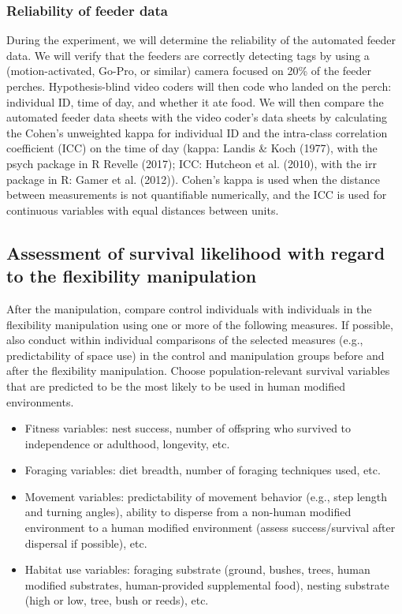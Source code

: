 \documentclass[
]{article}
\providecommand{\tightlist}{%
  \setlength{\itemsep}{0pt}\setlength{\parskip}{0pt}}
\begin{document}
\hypertarget{reliability-of-feeder-data}{%
\subsubsection{Reliability of feeder
data}\label{reliability-of-feeder-data}}

During the experiment, we will determine the reliability of the
automated feeder data. We will verify that the feeders are correctly
detecting tags by using a (motion-activated, Go-Pro, or similar) camera
focused on 20\% of the feeder perches. Hypothesis-blind video coders
will then code who landed on the perch: individual ID, time of day, and
whether it ate food. We will then compare the automated feeder data
sheets with the video coder's data sheets by calculating the Cohen's
unweighted kappa for individual ID and the intra-class correlation
coefficient (ICC) on the time of day (kappa: Landis \& Koch (1977), with
the psych package in R Revelle (2017); ICC: Hutcheon et al. (2010), with
the irr package in R: Gamer et al. (2012)). Cohen's kappa is used when
the distance between measurements is not quantifiable numerically, and
the ICC is used for continuous variables with equal distances between
units.

\hypertarget{assessment-of-survival-likelihood-with-regard-to-the-flexibility-manipulation}{%
\subsection{Assessment of survival likelihood with regard to the
flexibility
manipulation}\label{assessment-of-survival-likelihood-with-regard-to-the-flexibility-manipulation}}

After the manipulation, compare control individuals with individuals in
the flexibility manipulation using one or more of the following
measures. If possible, also conduct within individual comparisons of the
selected measures (e.g., predictability of space use) in the control and
manipulation groups before and after the flexibility manipulation.
Choose population-relevant survival variables that are predicted to be
the most likely to be used in human modified environments.

\begin{itemize}
\tightlist
\item
  Fitness variables: nest success, number of offspring who survived to
  independence or adulthood, longevity, etc.
\item
  Foraging variables: diet breadth, number of foraging techniques used,
  etc.
\item
  Movement variables: predictability of movement behavior (e.g., step
  length and turning angles), ability to disperse from a non-human
  modified environment to a human modified environment (assess
  success/survival after dispersal if possible), etc.
\item
  Habitat use variables: foraging substrate (ground, bushes, trees,
  human modified substrates, human-provided supplemental food), nesting
  substrate (high or low, tree, bush or reeds), etc.
\end{itemize}
\end{document}
